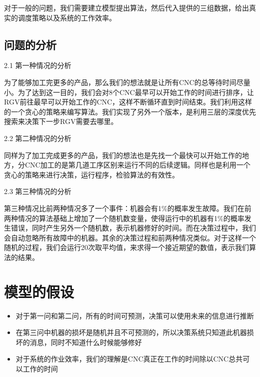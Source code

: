 \documentclass{cumcmthesis}
\begin{document}
对于一般的问题，我们需要建立模型提出算法，然后代入提供的三组数据，给出真实的调度策略以及系统的工作效率。


\subsection{问题的分析}

2.1 第一种情况的分析

为了能够加工完更多的产品，那么我们的想法就是让所有CNC的总等待时间尽量小。为了达到这一目的，我们会对8个CNC最早可以开始工作的时间进行排序，让RGV前往最早可以开始工作的CNC，这样不断循环直到时间结束。我们利用这样的一个贪心的策略来编写算法。我们实现了另外一个版本，是利用三层的深度优先搜索来决策下一步RGV需要去哪里。

2.2 第二种情况的分析

同样为了加工完成更多的产品，我们的想法也是先找一个最快可以开始工作的地方，分CNC加工的是第几道工序区别来运行不同的后续逻辑。同样也是利用一个贪心的策略来进行决策，运行程序，检验算法的有效性。

2.3 第三种情况的分析

第三种情况比前两种情况多了一个事件：机器会有1\%的概率发生故障。我们在前两种情况的算法基础上增加了一个随机数变量，使得运行中的机器有1\%的概率发生错误，同时产生另外一个随机数，表示机器修好的时间。而在决策过程中，我们会自动忽略所有故障中的机器。其余的决策过程和前两种情况类似。对于这样一个随机的过程，我们会运行20次取平均值，来求得一个接近期望的数值，表示我们算法的结果。


\section{模型的假设}

\begin{itemize}
\item 对于第一问和第二问，所有的时间可预测，决策可以使用未来的信息进行推断
\item 在第三问中机器的损坏是随机并且不可预测的，所以决策系统只知道此机器损坏的消息，同时不知道什么时候能够修好
\item 对于系统的作业效率，我们的理解是CNC真正在工作的时间除以CNC总共可以工作的时间
\end{itemize}
\end{document}
